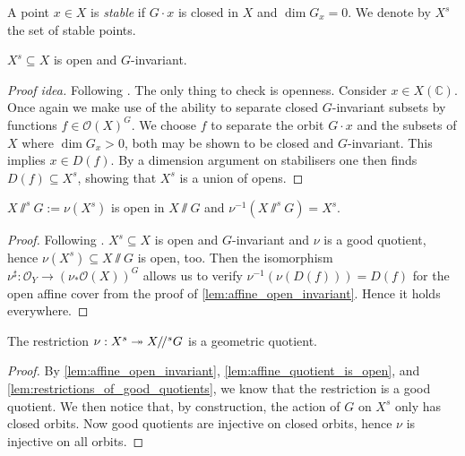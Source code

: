 \documentclass[12pt]{ociamthesis}  %
\begin{document}
\begin{definition}\label{def:affine_stability}
  A point $x\in X$ is \emph{stable} if $G\cdot x$ is closed in $X$
  and $\dim G_x = 0$. We denote by $X^s$ the set of stable
  points.
\end{definition}

\begin{lemma}\label{lem:affine_open_invariant}
  $X^s \subseteq X$ is open and $G$-invariant.
  \begin{proof}[Proof idea]
    Following \cite[Proposition 4.36]{hoskins2016}.
    The only thing to check is openness.
    Consider $x\in X(\mathbb C)$.  Once again we make use of the
    ability to separate closed $G$-invariant subsets by functions
    $f \in \mathscr O(X)^G$. \cite[Lemma 4.29]{hoskins2016}
    We choose $f$ to separate the orbit $G\cdot x$ and the
    subsets of $X$ where $\dim G_x > 0$, both may be shown to
    be closed and $G$-invariant. This implies $x\in D(f)$.
    By a dimension argument on stabilisers one then finds
    $D(f)\subseteq X^s$, showing that $X^s$ is a union of opens.
  \end{proof}
\end{lemma}

\begin{lemma}\label{lem:affine_quotient_is_open}
  $X\sslash^s G := \nu(X^s)$ is open in $X\sslash G$ and
  $\nu^{-1}(X\sslash^s G) = X^s$.
  \begin{proof}
    Following \cite[Proposition 4.36]{hoskins2016}.
    $X^s\subseteq X$ is open and $G$-invariant and $\nu$ is a good quotient,
    hence $\nu(X^s)\subseteq X\sslash G$ is open, too.
    Then the isomorphism $\nu^\sharp : \mathscr O_Y \to (\nu_*\mathscr O(X))^G$
    allows us to verify $\nu^{-1}(\nu(D(f))) = D(f)$ for the open
    affine cover from the proof of \ref{lem:affine_open_invariant}.
    Hence it holds everywhere.
  \end{proof}
\end{lemma}

\begin{theorem}\label{thm:affine_quotient_is_geometric}
  The restriction $\nu : X^s \twoheadrightarrow X/\!/^s G$ is a geometric quotient.
  \begin{proof}
    By \ref{lem:affine_open_invariant}, \ref{lem:affine_quotient_is_open},
    and \ref{lem:restrictions_of_good_quotients}, we know that
    the restriction is a good quotient. We then notice that, by construction,
    the action of $G$ on $X^s$ only has closed orbits. Now good
    quotients are injective on closed orbits, hence $\nu$ is injective
    on all orbits.
  \end{proof}
\end{theorem}
\end{document}
